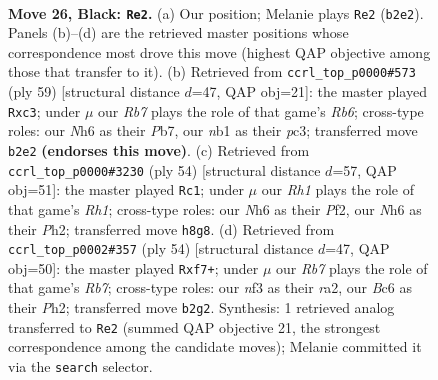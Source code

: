 \documentclass[11pt]{article}
\begin{document}
\clearpage

\begin{figure}[p]\centering
\begin{subfigure}{0.46\textwidth}\centering
\resizebox{\linewidth}{!}{%
\newchessgame
\chessboard[
  setfen={4k2r/5p2/P1b3pn/4P3/8/5NKR/1r4P1/RN6 b k - 1 26},
  showmover=false,
  pgfstyle=straightmove, color=movearrow, markmove={b2-e2}
]}
\caption{}
\end{subfigure}\hfill
\begin{subfigure}{0.46\textwidth}\centering
\resizebox{\linewidth}{!}{%
\newchessgame
\chessboard[
  setfen={4r1k1/Rp4pp/2b5/8/8/1rP3P1/4PPN1/4R1K1 b - - 0 30},
  showmover=false,
  pgfstyle=straightmove, color=movearrow, markmove={b3-c3}
]}
\caption{}
\end{subfigure}
\\[4pt]
\begin{subfigure}{0.46\textwidth}\centering
\resizebox{\linewidth}{!}{%
\newchessgame
\chessboard[
  setfen={2k5/2r2p1p/p1nRp3/8/P7/8/PB2KPrP/7R w - - 4 28},
  showmover=false,
  pgfstyle=straightmove, color=movearrow, markmove={h1-c1}
]}
\caption{}
\end{subfigure}\hfill
\begin{subfigure}{0.46\textwidth}\centering
\resizebox{\linewidth}{!}{%
\newchessgame
\chessboard[
  setfen={1n2rk2/1R3p1p/3P2p1/8/4NP2/p3R3/r5PP/6K1 w - - 0 28},
  showmover=false,
  pgfstyle=straightmove, color=movearrow, markmove={b7-f7}
]}
\caption{}
\end{subfigure}
\caption{\textbf{Move 26, Black: \texttt{Re2}.} (a) Our position; Melanie plays \texttt{Re2} (\texttt{b2e2}). Panels (b)--(d) are the retrieved master positions whose correspondence most drove this move (highest QAP objective among those that transfer to it). (b) Retrieved from \texttt{ccrl\_top\_p0000\#573} (ply 59) [structural distance $d$=47, QAP obj=21]: the master played \texttt{Rxc3}; under $\mu$ our \emph{Rb7} plays the role of that game's \emph{Rb6}; cross-type roles: our \emph{N}h6 as their \emph{P}b7, our \emph{n}b1 as their \emph{p}c3; transferred move \texttt{b2e2} \textbf{(endorses this move)}. (c) Retrieved from \texttt{ccrl\_top\_p0000\#3230} (ply 54) [structural distance $d$=57, QAP obj=51]: the master played \texttt{Rc1}; under $\mu$ our \emph{Rh1} plays the role of that game's \emph{Rh1}; cross-type roles: our \emph{N}h6 as their \emph{P}f2, our \emph{N}h6 as their \emph{P}h2; transferred move \texttt{h8g8}. (d) Retrieved from \texttt{ccrl\_top\_p0002\#357} (ply 54) [structural distance $d$=47, QAP obj=50]: the master played \texttt{Rxf7+}; under $\mu$ our \emph{Rb7} plays the role of that game's \emph{Rb7}; cross-type roles: our \emph{n}f3 as their \emph{r}a2, our \emph{B}c6 as their \emph{P}h2; transferred move \texttt{b2g2}. Synthesis: 1 retrieved analog transferred to \texttt{Re2} (summed QAP objective 21, the strongest correspondence among the candidate moves); Melanie committed it via the \texttt{search} selector.}
\label{fig:thought-m51}
\end{figure}
\end{document}
